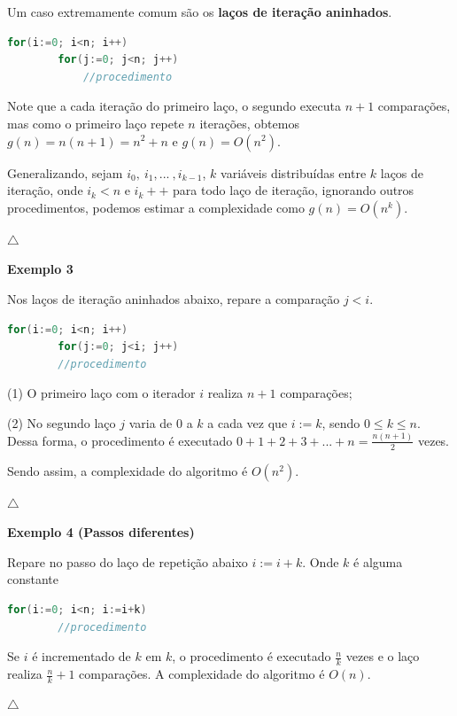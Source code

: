 Um caso extremamente comum são os \textbf{laços de iteração aninhados}.
\begin{lstlisting}[language=C, frame=single]
    for(i:=0; i<n; i++)
        for(j:=0; j<n; j++)
            //procedimento
\end{lstlisting}

Note que a cada iteração do primeiro laço, o segundo executa $n+1$ comparações, mas como o primeiro laço repete $n$ iterações, obtemos $g(n)=n(n+1)=n^2+n$ e $g(n)=O(n^2)$.

Generalizando, sejam $i_0, \ i_1, ... \ , i_{k-1}$, $k$ variáveis distribuídas entre $k$ laços de iteração, onde $i_k<n$ e $i_k++$ para todo laço de iteração, ignorando outros procedimentos, podemos estimar a complexidade como $g(n)=O(n^k)$.

{\raggedleft $\bigtriangleup$ \par}

\textbf{Exemplo 3}

Nos laços de iteração aninhados abaixo, repare a comparação $j<i$.

\begin{lstlisting}[language=C, frame=single]
    for(i:=0; i<n; i++)
        for(j:=0; j<i; j++)
        //procedimento
\end{lstlisting}

(1) O primeiro laço com o iterador $i$ realiza $n+1$ comparações;

(2) No segundo laço $j$ varia de $0$ a $k$ a cada vez que $i:=k$, sendo $0\leq k\leq n$. Dessa forma, o procedimento é executado $0+1+2+3+...+n = \frac{n(n+1)}{2}$ vezes.

Sendo assim, a complexidade do algoritmo é $O(n^2)$.

{\raggedleft $\bigtriangleup$ \par}

\textbf{Exemplo 4 (Passos diferentes)}

Repare no passo do laço de repetição abaixo $i:=i+k$. Onde $k$ é alguma constante

\begin{lstlisting}[language=C, frame=single]
    for(i:=0; i<n; i:=i+k)
        //procedimento
\end{lstlisting}

Se $i$ é incrementado de $k$ em $k$, o procedimento é executado $\frac{n}{k}$ vezes e o laço realiza $\frac{n}{k}+1$ comparações. A complexidade do algoritmo é $O(n)$.

{\raggedleft $\bigtriangleup$ \par}

